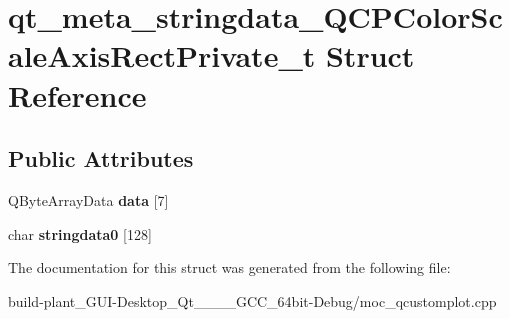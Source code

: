 \hypertarget{structqt__meta__stringdata__QCPColorScaleAxisRectPrivate__t}{}\section{qt\+\_\+meta\+\_\+stringdata\+\_\+\+Q\+C\+P\+Color\+Scale\+Axis\+Rect\+Private\+\_\+t Struct Reference}
\label{structqt__meta__stringdata__QCPColorScaleAxisRectPrivate__t}
\subsection*{Public Attributes}
\begin{DoxyCompactItemize}
\item 
\mbox{\label{structqt__meta__stringdata__QCPColorScaleAxisRectPrivate__t_ad6a4e6859b02e86ad4cab1b35d1a9e24}} 
Q\+Byte\+Array\+Data {\bfseries data} \mbox{[}7\mbox{]}
\item 
\mbox{\label{structqt__meta__stringdata__QCPColorScaleAxisRectPrivate__t_ab4bf0dacc0cccfabffae8da79f9f5f46}} 
char {\bfseries stringdata0} \mbox{[}128\mbox{]}
\end{DoxyCompactItemize}


The documentation for this struct was generated from the following file\+:\begin{DoxyCompactItemize}
\item 
build-\/plant\+\_\+\+G\+U\+I-\/\+Desktop\+\_\+\+Qt\+\_\+\_\+\_\+\_\+\+G\+C\+C\+\_\+64bit-\/\+Debug/moc\+\_\+qcustomplot.\+cpp\end{DoxyCompactItemize}
